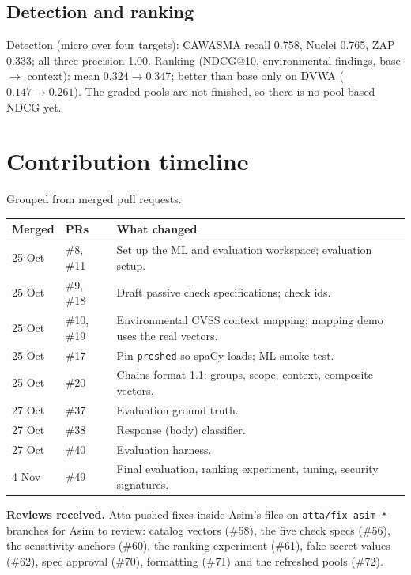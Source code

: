 \subsection{Detection and ranking}
Detection (micro over four targets): CAWASMA recall 0.758, Nuclei 0.765, ZAP
0.333; all three precision 1.00. Ranking
(NDCG@10, environmental findings, base $\rightarrow$ context): mean $0.324
\rightarrow 0.347$; better than base only on DVWA
($0.147\rightarrow0.261$).
The graded pools are not finished, so there is no pool-based NDCG yet.

\section{Contribution timeline}
Grouped from merged pull requests.
\begin{center}\small
\begin{tabularx}{\linewidth}{@{}llX@{}}
\toprule
Merged & PRs & What changed\\
\midrule
25 Oct & \#8, \#11 & Set up the ML and evaluation workspace; evaluation setup.\\
25 Oct & \#9, \#18 & Draft passive check specifications; check ids.\\
25 Oct & \#10, \#19 & Environmental CVSS context mapping; mapping demo uses the real vectors.\\
25 Oct & \#17 & Pin \texttt{preshed} so spaCy loads; ML smoke test.\\
25 Oct & \#20 & Chains format 1.1: groups, scope, context, composite vectors.\\
27 Oct & \#37 & Evaluation ground truth.\\
27 Oct & \#38 & Response (body) classifier.\\
27 Oct & \#40 & Evaluation harness.\\
4 Nov & \#49 & Final evaluation, ranking experiment, tuning, security signatures.\\
\bottomrule
\end{tabularx}
\end{center}
\textbf{Reviews received.} Atta pushed fixes inside Asim's files on
\texttt{atta/fix-asim-*} branches for Asim to review: catalog vectors (\#58),
the five check specs (\#56), the sensitivity anchors (\#60), the ranking
experiment (\#61), fake-secret values (\#62), spec approval (\#70), formatting
(\#71) and the refreshed pools (\#72).

